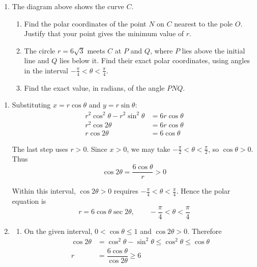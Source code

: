 \documentclass[leqno]{article}
\begin{document}
\begin{enumerate}[
  label=\textbf{\arabic*.},
  leftmargin=*,
  topsep=0pt,
  partopsep=0pt,
  parsep=0pt
]
\begin{enumerate}[label=\textbf{(\alph*)}]
\item The diagram above shows the curve $C$. \\
\begin{enumerate}[label=(\roman*)]
\item Find the polar coordinates of the point $N$ on $C$ nearest to the pole $O$. Justify that your point gives the minimum value of $r$.  \\
\item The circle $r=6\sqrt{3}$ meets $C$ at $P$ and $Q$, where $P$ lies above the initial line and $Q$ lies below it. Find their exact polar coordinates, using angles in the interval $-\frac{\pi}{4}<\theta<\frac{\pi}{4}$.  \\
\item Find the exact value, in radians, of the angle $PNQ$.  \\
\end{enumerate}
\end{enumerate}

\vspace*{10pt}

\begin{djsSolution}
\begin{enumerate}[label=\textbf{(\alph*)}, start=1]
\item Substituting \(x=r\cos\theta\) and \(y=r\sin\theta\):
\begin{align*}
r^2\cos^2\theta-r^2\sin^2\theta&=6r\cos\theta\\
r^2\cos2\theta&=6r\cos\theta\\
r\cos2\theta&=6\cos\theta
\end{align*}

The last step uses \(r>0\). Since \(x>0\), we may take \(-\frac{\pi}{2}<\theta<\frac{\pi}{2}\), so \(\cos\theta>0\). Thus
\[
\cos2\theta=\dfrac{6\cos\theta}{r}>0
\]

Within this interval, \(\cos2\theta>0\) requires \(-\frac{\pi}{4}<\theta<\frac{\pi}{4}\). Hence the polar equation is
\[
r=6\cos\theta\sec2\theta,\qquad -\dfrac{\pi}{4}<\theta<\dfrac{\pi}{4}
\]

\item
\begin{enumerate}[label=(\roman*), start=1]
\item On the given interval, \(0<\cos\theta\leq1\) and \(\cos2\theta>0\). Therefore
\begin{align*}
\cos2\theta&=\cos^2\theta-\sin^2\theta\leq\cos^2\theta\leq\cos\theta\\
r&=\dfrac{6\cos\theta}{\cos2\theta}\geq6
\end{align*}


\end{enumerate}
\end{enumerate}
\end{djsSolution}
\end{enumerate}
\end{document}
